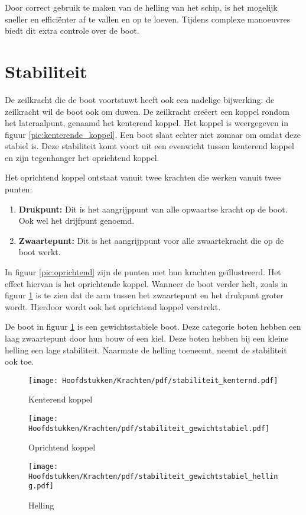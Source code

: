 Door correct gebruik te maken van de helling van het schip, is het mogelijk sneller en efficiënter af te vallen en op te loeven. Tijdens complexe manoeuvres biedt dit extra controle over de boot.  

\section{Stabiliteit}
De zeilkracht die de boot voortstuwt heeft ook een nadelige bijwerking: de zeilkracht wil de boot ook om duwen. De zeilkracht creëert een koppel rondom het lateraalpunt, genaamd het kenterend koppel. Het koppel is weergegeven in figuur \ref{pic:kenterende_koppel}. Een boot slaat echter niet zomaar om omdat deze stabiel is. Deze stabiliteit komt voort uit een evenwicht tussen kenterend koppel en zijn tegenhanger het oprichtend koppel. 

Het oprichtend koppel ontstaat vanuit twee krachten die werken vanuit twee punten:
\begin{enumerate}
	\item \textbf{Drukpunt:} Dit is het aangrijppunt van alle opwaartse kracht op de boot. Ook wel het drijfpunt genoemd.
	\item \textbf{Zwaartepunt:} Dit is het aangrijppunt voor alle zwaartekracht die op de boot werkt.
\end{enumerate}

In figuur \ref{pic:oprichtend} zijn de punten met hun krachten geïllustreerd. Het effect hiervan is het oprichtende koppel. Wanneer de boot verder helt, zoals in figuur \ref{pic:oprichtend_helling} is te zien dat de arm tussen het zwaartepunt en het drukpunt groter wordt. Hierdoor wordt ook het oprichtend koppel verstrekt. 

De boot in figuur \ref{pic:oprichtend_helling} is een gewichtsstabiele boot. Deze categorie boten hebben een laag zwaartepunt door hun bouw of een kiel. Deze boten hebben bij een kleine helling een lage stabiliteit. Naarmate de helling toeneemt, neemt de stabiliteit ook toe. 

\begin{figure}[H]
	\centering
	\begin{minipage}[b]{0.32\textwidth}
		\centering
		\texttt{[image: Hoofdstukken/Krachten/pdf/stabiliteit\_kenternd.pdf]}
		\caption{Kenterend koppel}
		\label{pic:kenterende_koppel}
	\end{minipage}
	\hfill
	\begin{minipage}[b]{0.33\textwidth}
		\centering
		\texttt{[image: Hoofdstukken/Krachten/pdf/stabiliteit\_gewichtstabiel.pdf]}
		\caption{Oprichtend koppel}
		\label{pic:oprichtend}
	\end{minipage}
	\hfill
	\begin{minipage}[b]{0.32\textwidth}
		\centering
		\texttt{[image: Hoofdstukken/Krachten/pdf/stabiliteit\_gewichtstabiel\_helling.pdf]}
		\caption{Helling}
		\label{pic:oprichtend_helling}
	\end{minipage}
\end{figure}

